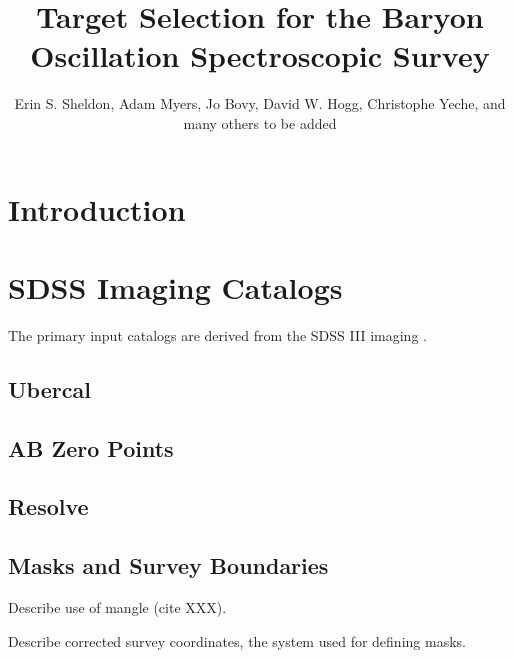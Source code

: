 \documentclass[12pt,preprint]{aastex}
\begin{document}
\title{Target Selection for the Baryon Oscillation Spectroscopic Survey}



\author{
Erin S. Sheldon,
Adam Myers,
Jo Bovy,
David W. Hogg,
Christophe Yeche,
and many others to be added
}


\clearpage
\tableofcontents

\section{Introduction}


\section{SDSS Imaging Catalogs} \label{sec:sdssdata}

The primary input catalogs are derived from the SDSS III imaging \citep{dr8}.

\subsection{Ubercal}

\subsection{AB Zero Points}

\subsection{Resolve}

\subsection{Masks and Survey Boundaries}

Describe use of mangle (cite XXX).

Describe corrected survey coordinates, the system used for defining masks.
\end{document}
